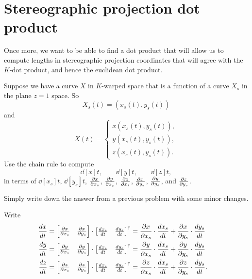 \documentclass{ximera}
\begin{document}
\section{Stereographic projection dot product}

Once more, we want to be able to find a dot product that will allow us
to compute lengths in stereographic projection coordinates that will agree
with the $K$-dot product, and hence the euclidean dot product.

\begin{problem}
Suppose we have a curve $X$ in $K$-warped space that is a function of
a curve $X_s$ in the plane $z=1$ space. So
\[
X_s(t) = \left( x_s(t),y_s(t)\right)
\]
and
\[
X(t) = 
\begin{cases}
  x(x_s(t),y_s(t)),\\
  y(x_s(t),y_s(t)),\\
  z(x_s(t),y_s(t)).
\end{cases}
\]
Use the chain rule to compute
\[
\dd[x]{t}, \qquad \dd[y]{t}, \qquad \dd[z]{t},
\]
in terms of $\dd[x_s]{t}$, $\dd[y_s]{t}$, $\pp[x]{x_s}$,
$\pp[y]{x_s}$, $\pp[z]{x_s}$, $\pp[x]{y_s}$, $\pp[y]{y_s}$,
and $\pp[z]{y_s}$.
  \begin{hint}
  Simply write down the answer from a previous problem with some minor
  changes.
  \end{hint}
  \begin{freeResponse}
  Write
  \begin{align*}
    \dd[x]{t} &= \begin{bmatrix}\pp[x]{x_s} & \pp[x]{y_s}\end{bmatrix}\cdot\begin{bmatrix}\dd[x_s]{t} & \dd[y_s]{t}\end{bmatrix}^\transpose = \pp[x]{x_s}\cdot\dd[x_s]{t}+\pp[x]{y_s}\cdot\dd[y_s]{t} &  \\
    \dd[y]{t} &= \begin{bmatrix}\pp[y]{x_s} & \pp[y]{y_s}\end{bmatrix}\cdot\begin{bmatrix}\dd[x_s]{t} & \dd[y_s]{t}\end{bmatrix}^\transpose = \pp[y]{x_s}\cdot\dd[x_s]{t}+\pp[y]{y_s}\cdot\dd[y_s]{t} &  \\
    \dd[z]{t} &= \begin{bmatrix}\pp[z]{x_s} & \pp[z]{y_s}\end{bmatrix}\cdot\begin{bmatrix}\dd[x_s]{t} & \dd[y_s]{t}\end{bmatrix}^\transpose = \pp[z]{x_s}\cdot\dd[x_s]{t}+\pp[z]{y_s}\cdot\dd[y_s]{t}.  
  \end{align*}
\end{freeResponse}
\end{problem}
\end{document}
